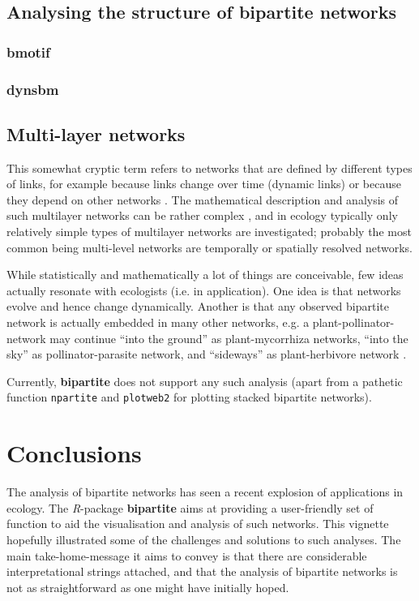 \documentclass[a4paper, 11pt]{article}\usepackage[]{graphicx}\usepackage[]{color}
\newcommand{\package}[1]{\textbf{#1}}
\newcommand{\proglang}[1]{\textsl{#1}}
\newcommand{\code}[1]{\texttt{#1}}
\begin{document}
\subsection{Analysing the structure of bipartite networks}

\subsubsection{\package{bmotif}}

\subsubsection{\package{dynsbm}}


\subsection{Multi-layer networks}
This somewhat cryptic term refers to networks that are defined by different types of links, for example because links change over time (dynamic links) or because they depend on other networks \citep{Pilosof2017}. The mathematical description and analysis of such multilayer networks can be rather complex \citep{Aleta2019}, and in ecology typically only relatively simple types of multilayer networks are investigated; probably the most common being multi-level networks are temporally or spatially resolved networks.

While statistically and mathematically a lot of things are conceivable, few ideas actually resonate with ecologists (i.e. in application). One idea is that networks evolve and hence change dynamically. Another is that any observed bipartite network is actually embedded in many other networks, e.g. a plant-pollinator-network may continue ``into the ground'' as plant-mycorrhiza networks, ``into the sky'' as pollinator-parasite network, and ``sideways'' as plant-herbivore network \citep{Pocock2012}. 

Currently, \package{bipartite} does not support any such analysis (apart from a pathetic function \code{npartite} and \code{plotweb2} for plotting stacked bipartite networks).


\section*{Conclusions}%
The analysis of bipartite networks has seen a recent explosion of applications in ecology. The \proglang{R}-package \package{bipartite} aims at providing a user-friendly set of function to aid the visualisation and analysis of such networks. This vignette hopefully illustrated some of the challenges and solutions to such analyses. The main take-home-message it aims to convey is that there are considerable interpretational strings attached, and that the analysis of bipartite networks is not as straightforward as one might have initially hoped.
\end{document}
